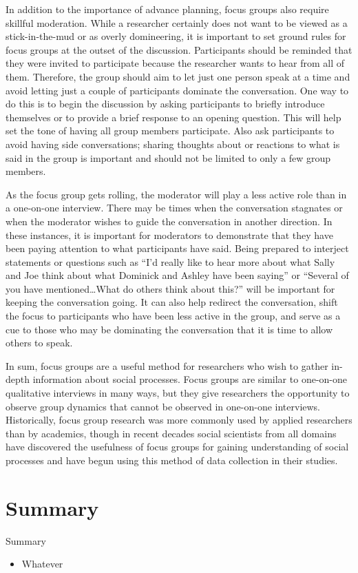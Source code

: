 In addition to the importance of advance planning, focus groups also require skillful moderation. While a researcher certainly does not want to be viewed as a stick-in-the-mud or as overly domineering, it is important to set ground rules for focus groups at the outset of the discussion. Participants should be reminded that they were invited to participate because the researcher wants to hear from all of them. Therefore, the group should aim to let just one person speak at a time and avoid letting just a couple of participants dominate the conversation. One way to do this is to begin the discussion by asking participants to briefly introduce themselves or to provide a brief response to an opening question. This will help set the tone of having all group members participate. Also ask participants to avoid having side conversations; sharing thoughts about or reactions to what is said in the group is important and should not be limited to only a few group members.

As the focus group gets rolling, the moderator will play a less active role than in a one-on-one interview. There may be times when the conversation stagnates or when the moderator wishes to guide the conversation in another direction. In these instances, it is important for moderators to demonstrate that they have been paying attention to what participants have said. Being prepared to interject statements or questions such as ``I'd really like to hear more about what Sally and Joe think about what Dominick and Ashley have been saying'' or ``Several of you have mentioned\ldots What do others think about this?'' will be important for keeping the conversation going. It can also help redirect the conversation, shift the focus to participants who have been less active in the group, and serve as a cue to those who may be dominating the conversation that it is time to allow others to speak.

In sum, focus groups are a useful method for researchers who wish to gather in-depth information about social processes. Focus groups are similar to one-on-one qualitative interviews in many ways, but they give researchers the opportunity to observe group dynamics that cannot be observed in one-on-one interviews. Historically, focus group research was more commonly used by applied researchers than by academics, though in recent decades social scientists from all domains have discovered the usefulness of focus groups for gaining understanding of social processes and have begun using this method of data collection in their studies.

\section{Summary}\label{ch10:summary}

\begin{center}
	\begin{tkawybox}{Summary}
		\begin{itemize}
			\setlength{\itemsep}{0pt}
			\setlength{\parskip}{0pt}
			\setlength{\parsep}{0pt}
			
			\item Whatever
			
		\end{itemize}
	\end{tkawybox}
\end{center}
